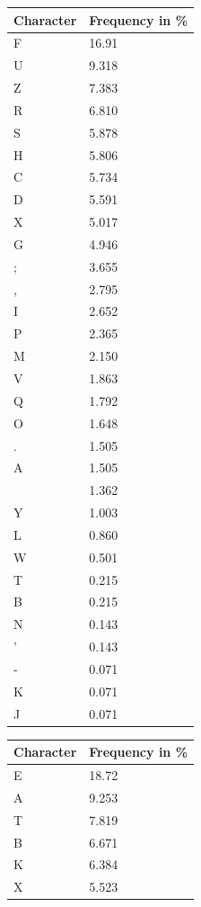 \documentclass{uva-inf-presentation}
\begin{document}
\begin{frame}[containsverbatim]
\begin{minipage}{0.2\linewidth}
\centering
{\fontsize{3.5pt}{4.5pt}\selectfont
\begin{tabular}{ll}\toprule
Character & Frequency in \%     \\
\midrule
F & 16.91 \\
U & 9.318 \\
Z & 7.383 \\
R & 6.810 \\
S & 5.878 \\
H & 5.806 \\
C & 5.734 \\
D & 5.591 \\
X & 5.017 \\
G & 4.946 \\
; & 3.655 \\
, & 2.795 \\
I & 2.652 \\
P & 2.365 \\
M & 2.150 \\
V & 1.863 \\
Q & 1.792 \\
O & 1.648 \\
. & 1.505 \\
A & 1.505 \\
  & 1.362 \\
Y & 1.003 \\
L & 0.860 \\
W & 0.501 \\
T & 0.215 \\
B & 0.215 \\
N & 0.143 \\
' & 0.143 \\
- & 0.071 \\
K & 0.071 \\
J & 0.071 \\ \bottomrule
\end{tabular}}
\end{minipage}%
\begin{minipage}{0.2\linewidth}
\centering
{\fontsize{3.5pt}{4.5pt}\selectfont
\begin{tabular}{ll}\toprule
Character & Frequency in \%     \\
\midrule
E & 18.72 \\
A & 9.253 \\
T & 7.819 \\
B & 6.671 \\
K & 6.384 \\
X & 5.523 \\

\end{tabular}}
\end{minipage}
\end{frame}
\end{document}
